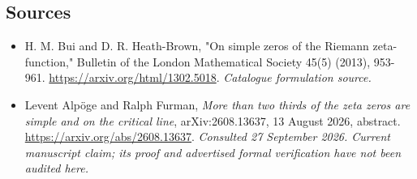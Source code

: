 \documentclass[11pt,a4paper]{article}
\numberwithin{equation}{section}
\begin{document}
\subsection{Sources}
\begin{itemize}\raggedright
\item[\textnormal{[S1]}]\hypertarget{source:statement:1}{} H. M. Bui and D. R. Heath-Brown, "On simple zeros of the Riemann zeta-function," Bulletin of the London Mathematical Society 45(5) (2013), 953-961.
\url{https://arxiv.org/html/1302.5018}.
{\small\textit{Catalogue formulation source.}}
\item[\textnormal{[E1]}]\hypertarget{extra:statement:1}{} Levent Alp\"oge and
Ralph Furman, \emph{More than two thirds of the zeta zeros are simple and on
the critical line}, arXiv:2608.13637, 13 August 2026, abstract.
\url{https://arxiv.org/abs/2608.13637}.
{\small\textit{Consulted 27 September 2026. Current manuscript claim;
its proof and advertised formal verification have not been audited here.}}
\end{itemize}
\end{document}
